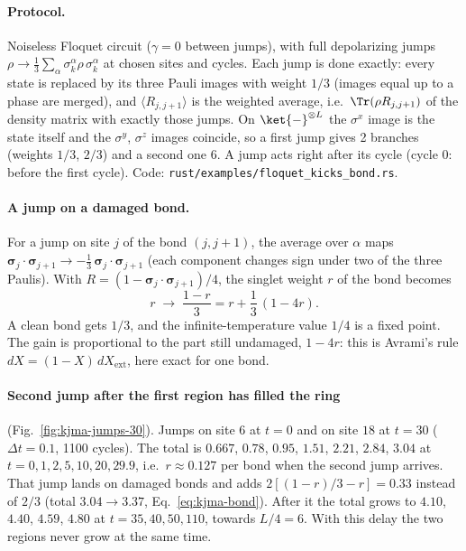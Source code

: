 \paragraph{Protocol.} Noiseless Floquet circuit ($\gamma = 0$ between jumps), with full depolarizing jumps $\rho \to \tfrac13\sum_\alpha\sigma^\alpha_k\rho\,\sigma^\alpha_k$ at chosen sites and cycles. Each jump is done exactly: every state is replaced by its three Pauli images with weight $1/3$ (images equal up to a phase are merged), and $\langle R_{j,j+1}\rangle$ is the weighted average, i.e.\ $\Tr(\rho R_{j,j+1})$ of the density matrix with exactly those jumps. On $\ket{-}^{\otimes L}$ the $\sigma^x$ image is the state itself and the $\sigma^y$, $\sigma^z$ images coincide, so a first jump gives 2 branches (weights $1/3$, $2/3$) and a second one 6. A jump acts right after its cycle (cycle $0$: before the first cycle). Code: \texttt{rust/examples/floquet\_kicks\_bond.rs}.

\paragraph{A jump on a damaged bond.} For a jump on site $j$ of the bond $(j, j+1)$, the average over $\alpha$ maps $\boldsymbol\sigma_j\cdot\boldsymbol\sigma_{j+1} \to -\tfrac13\,\boldsymbol\sigma_j\cdot\boldsymbol\sigma_{j+1}$ (each component changes sign under two of the three Paulis). With $R = (1 - \boldsymbol\sigma_j\cdot\boldsymbol\sigma_{j+1})/4$, the singlet weight $r$ of the bond becomes
\begin{equation}
r \;\to\; \frac{1 - r}{3} = r + \frac13\,(1 - 4r).
\label{eq:kjma-bond}
\end{equation}
A clean bond gets $1/3$, and the infinite-temperature value $1/4$ is a fixed point. The gain is proportional to the part still undamaged, $1 - 4r$: this is Avrami's rule $dX = (1 - X)\,dX_{\mathrm{ext}}$, here exact for one bond.

\paragraph{Second jump after the first region has filled the ring} (Fig.~\ref{fig:kjma-jumps-30}). Jumps on site $6$ at $t = 0$ and on site $18$ at $t = 30$ ($\Delta t = 0.1$, 1100 cycles). The total is $0.667$, $0.78$, $0.95$, $1.51$, $2.21$, $2.84$, $3.04$ at $t = 0, 1, 2, 5, 10, 20, 29.9$, i.e.\ $r \approx 0.127$ per bond when the second jump arrives. That jump lands on damaged bonds and adds $2[(1 - r)/3 - r] = 0.33$ instead of $2/3$ (total $3.04 \to 3.37$, Eq.~\eqref{eq:kjma-bond}). After it the total grows to $4.10$, $4.40$, $4.59$, $4.80$ at $t = 35, 40, 50, 110$, towards $L/4 = 6$. With this delay the two regions never grow at the same time.

